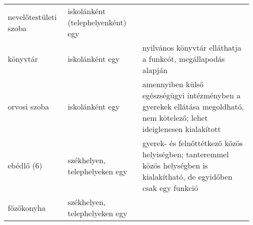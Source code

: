 \begin{longtable}[]{@{}lll@{}}
\begin{minipage}[t]{0.13\columnwidth}\raggedright
nevelőtestületi szoba\strut
\end{minipage} & \begin{minipage}[t]{0.26\columnwidth}\raggedright
iskolánként (telephelyenként) egy\strut
\end{minipage} & \begin{minipage}[t]{0.51\columnwidth}\raggedright
\strut
\end{minipage}\tabularnewline
\begin{minipage}[t]{0.13\columnwidth}\raggedright
könyvtár\strut
\end{minipage} & \begin{minipage}[t]{0.26\columnwidth}\raggedright
iskolánként egy\strut
\end{minipage} & \begin{minipage}[t]{0.51\columnwidth}\raggedright
nyilvános könyvtár elláthatja a funkcót, megállapodás alapján\strut
\end{minipage}\tabularnewline
\begin{minipage}[t]{0.13\columnwidth}\raggedright
orvosi szoba\strut
\end{minipage} & \begin{minipage}[t]{0.26\columnwidth}\raggedright
iskolánként egy\strut
\end{minipage} & \begin{minipage}[t]{0.51\columnwidth}\raggedright
amennyiben külső egészségügyi intézményben a gyerekek ellátása
megoldható, nem kötelező; lehet ideiglenesen kialakított\strut
\end{minipage}\tabularnewline
\begin{minipage}[t]{0.13\columnwidth}\raggedright
ebédlő (6)\strut
\end{minipage} & \begin{minipage}[t]{0.26\columnwidth}\raggedright
székhelyen, telephelyeken egy\strut
\end{minipage} & \begin{minipage}[t]{0.51\columnwidth}\raggedright
gyerek- és felnőttétkező közös helyiségben; tanteremmel közös helységben
is kialakítható, de egyidőben csak egy funkció\strut
\end{minipage}\tabularnewline
\begin{minipage}[t]{0.13\columnwidth}\raggedright
főzőkonyha\strut
\end{minipage} & \begin{minipage}[t]{0.26\columnwidth}\raggedright
székhelyen, telephelyeken egy\strut

\end{minipage}
\end{longtable}

